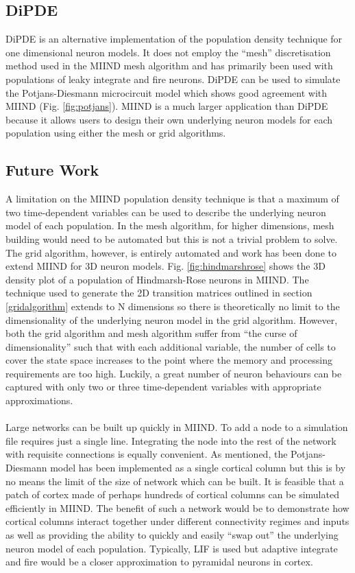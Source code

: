 \documentclass[utf8]{frontiersSCNS} %
\begin{document}
\subsection*{DiPDE}
DiPDE \citep{dipdewebsite,iyer2013influence} is an alternative implementation of the population density technique for one dimensional neuron models. It does not employ the ``mesh'' discretisation method used in the MIIND mesh algorithm and has primarily been used with populations of leaky integrate and fire neurons. DiPDE can be used to simulate the Potjans-Diesmann microcircuit model \citep{cain2016computational} which shows good agreement with MIIND (Fig. \ref{fig:potjans}). MIIND is a much larger application than DiPDE because it allows users to design their own underlying neuron models for each population using either the mesh or grid algorithms. \\

\subsection*{Future Work}
A limitation on the MIIND population density technique is that a maximum of two time-dependent variables can be used to describe the underlying neuron model of each population. In the mesh algorithm, for higher dimensions, mesh building would need to be automated but this is not a trivial problem to solve. The grid algorithm, however, is entirely automated and work has been done to extend MIIND for 3D neuron models. Fig. \ref{fig:hindmarshrose} shows the 3D density plot of a population of Hindmarsh-Rose neurons in MIIND. The technique used to generate the 2D transition matrices outlined in section \ref{gridalgorithm} extends to N dimensions so there is theoretically no limit to the dimensionality of the underlying neuron model in the grid algorithm. However, both the grid algorithm and mesh algorithm suffer from ``the curse of dimensionality'' such that with each additional variable, the number of cells to cover the state space increases to the point where the memory and processing requirements are too high. Luckily, a great number of neuron behaviours can be captured with only two or three time-dependent variables with appropriate approximations.\\
\\
 Large networks can be built up quickly in MIIND. To add a node to a simulation file requires just a single line. Integrating the node into the rest of the network with requisite connections is equally convenient. As mentioned, the Potjans-Diesmann model has been implemented as a single cortical column but this is by no means the limit of the size of network which can be built. It is feasible that a patch of cortex made of perhaps hundreds of cortical columns can be simulated efficiently in MIIND. The benefit of such a network would be to demonstrate how cortical columns interact together under different connectivity regimes and inputs as well as providing the ability to quickly and easily ``swap out'' the underlying neuron model of each population. Typically, LIF is used but adaptive integrate and fire would be a closer approximation to pyramidal neurons in cortex.\\
 
\end{document}
